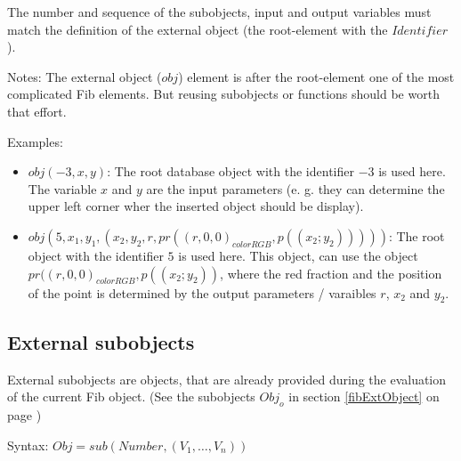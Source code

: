 The number and sequence of the subobjects, input and output variables must match the definition of the external object (the root-element with the $Identifier$).

\bigskip\noindent
Notes:
The external object ($obj$) element is after the root-element one of the most complicated Fib elements. But reusing subobjects or functions should be worth that effort.

\bigskip\noindent
Examples:
\begin{itemize}
 \item $obj( -3 , x, y )$: The root database object with the identifier $-3$ is used here. The variable $x$ and $y$ are the input parameters (e. g. they can determine the upper left corner wher the inserted object should be display).
 \item $obj( 5 , x_1, y_1 , ( x_2, y_2, r, pr( (r, 0, 0)_{colorRGB}, p((x_2;y_2)) ) ) )$: The root object with the identifier $5$ is used here. This object, can use the object\\ $pr( (r, 0, 0)_{colorRGB}, p((x_2;y_2))$, where the red fraction and the position of the point is determined by the output parameters / varaibles $r$, $x_2$ and $y_2$.
\end{itemize}



\subsection{External subobjects}
\label{fibSubobject}

External subobjects are objects, that are already provided during the evaluation of the current Fib object. (See the subobjects $Obj_o$ in section \ref{fibExtObject} on page \pageref{fibExtObject})

\bigskip\noindent
Syntax:
$Obj = sub( Number , ( V_1 , \ldots , V_n ) )$

